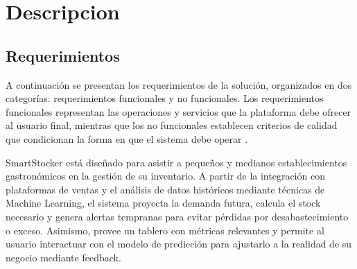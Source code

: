 \chapter{Descripcion}\label{chapter04}

\section{Requerimientos}\label{sec:requerimientos}
A continuación se presentan los requerimientos de la solución, organizados en dos categorías: requerimientos funcionales y no funcionales. Los requerimientos funcionales representan las operaciones y servicios que la plataforma debe ofrecer al usuario final, mientras que los no funcionales establecen criterios de calidad que condicionan la forma en que el sistema debe operar \parencite{ieee2008}.

SmartStocker está diseñado para asistir a pequeños y medianos establecimientos gastronómicos en la gestión de su inventario. A partir de la integración con plataformas de ventas y el análisis de datos históricos mediante técnicas de Machine Learning, el sistema proyecta la demanda futura, calcula el stock necesario y genera alertas tempranas para evitar pérdidas por desabastecimiento o exceso. Asimismo, provee un tablero con métricas relevantes y permite al usuario interactuar con el modelo de predicción para ajustarlo a la realidad de su negocio mediante feedback.

